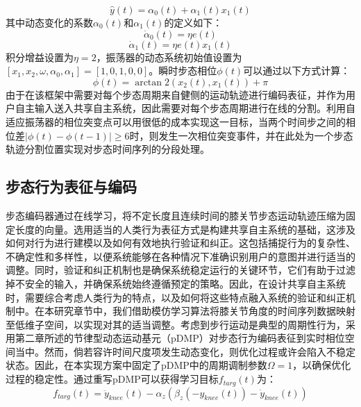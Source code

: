 \begin{equation}
\label{deqn_ex4}
\hat y(t) = {\alpha _0}(t) + {\alpha _1}(t){x_1}(t)
\end{equation}    
其中动态变化的系数${\alpha _0}(t)$和${\alpha _1}(t)$的定义如下：
\begin{equation}
\label{deqn_ex5}
{\dot \alpha _0}(t) = \eta e(t)
\end{equation}   
\begin{equation}
\label{deqn_ex6}
{\dot \alpha _1}(t) = \eta e(t){x_1}(t)
\end{equation} 
积分增益设置为$\eta=2$，振荡器的动态系统初始值设置为$[{x_1},{x_2},\omega ,{\alpha _0},{\alpha _1}] = [1,0,1,0,0]$。瞬时步态相位$\phi (t)$可以通过以下方式计算：
\begin{equation}
\label{deqn_ex7}
\phi (t) = \arctan 2({x_2}(t),{x_1}(t)) + \pi 
\end{equation}    
由于在该框架中需要对每个步态周期来自健侧的运动轨迹进行编码表征，并作为用户自主输入送入共享自主系统，因此需要对每个步态周期进行在线的分割。利用自适应振荡器的相位突变点可以用很低的成本实现这一目标，当两个时间步之间的相位差$\lvert \phi (t) - \phi (t - 1) \rvert \geq 6$时，则发生一次相位突变事件，并在此处为一个步态轨迹分割位置实现对步态时间序列的分段处理。  

\subsection{步态行为表征与编码} 步态编码器通过在线学习，将不定长度且连续时间的膝关节步态运动轨迹压缩为固定长度的向量。选用适当的人类行为表征方式是构建共享自主系统的基础，这涉及如何对行为进行建模以及如何有效地执行验证和纠正。这包括捕捉行为的复杂性、不确定性和多样性，以便系统能够在各种情况下准确识别用户的意图并进行适当的调整。同时，验证和纠正机制也是确保系统稳定运行的关键环节，它们有助于过滤掉不安全的输入，并确保系统始终遵循预定的策略。因此，在设计共享自主系统时，需要综合考虑人类行为的特点，以及如何将这些特点融入系统的验证和纠正机制中。在本研究章节中，我们借助模仿学习算法\cite{schaalImitationLearningRoute1999}将膝关节角度的时间序列数据映射至低维子空间，以实现对其的适当调整。考虑到步行运动是典型的周期性行为，采用第二章所述的节律型动态运动基元（pDMP）\cite{ijspeertDynamicalMovementPrimitives2013,gamsOnlineLearningModulation2009}对步态行为编码表征到实时相位空间当中。然而，倘若容许时间尺度项发生动态变化，则优化过程或许会陷入不稳定状态。因此，在本实现方案中固定了pDMP中的周期调制参数$\Omega  = 1$，以确保优化过程的稳定性。通过重写pDMP可以获得学习目标${f_{targ}}(t)$为：
\begin{equation}
  {f_{targ}}(t) = {\ddot y_{knee}}(t) - {\alpha _z}({\beta _z}( - {y_{knee}}(t)) - {\dot y_{knee}}(t))
  \label{eq:5-1}
\end{equation}    

